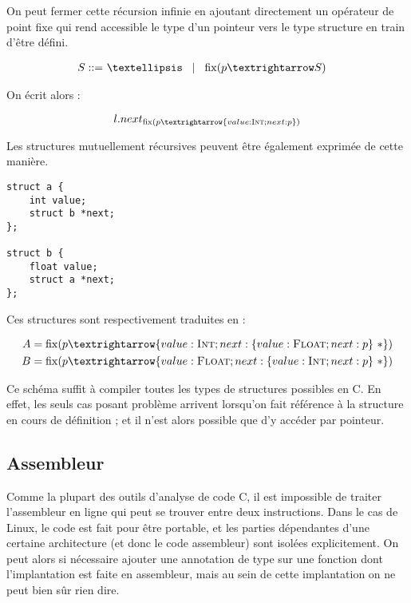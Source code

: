 On peut fermer cette récursion infinie en ajoutant directement un opérateur de
point fixe qui rend accessible le type d'un pointeur vers le type structure en
train d'être défini.

\begin{align*}
    S \gramisa & … \gramorx \mathrm{fix}(p → S)
\end{align*}

On écrit alors :

\[
  l.next_{ \mathrm{fix}(p → \{ value : \tInt ; next : p \}) }
\]

Les structures mutuellement récursives peuvent être également exprimée de cette
manière.

\begin{verbatim}
struct a {
    int value;
    struct b *next;
};

struct b {
    float value;
    struct a *next;
};
\end{verbatim}

Ces structures sont respectivement traduites en :

\begin{align*}
  A &= \mathrm{fix} (p → \{ value : \tInt   ; next : \{ value : \tFloat ; next : p \}~* \}) \\
  B &= \mathrm{fix} (p → \{ value : \tFloat ; next : \{ value : \tInt   ; next : p \}~* \})
\end{align*}

Ce schéma suffit à compiler toutes les types de structures possibles en C. En
effet, les seuls cas posant problème arrivent lorsqu'on fait référence à la
structure en cours de définition ; et il n'est alors possible que d'y accéder
par pointeur.


\subsection{Assembleur}

Comme la plupart des outils d'analyse de code C, il est impossible de traiter
l'assembleur en ligne qui peut se trouver entre deux instructions. Dans le cas
de Linux, le code est fait pour être portable, et les parties dépendantes d'une
certaine architecture (et donc le code assembleur) sont isolées explicitement.
On peut alors si nécessaire ajouter une annotation de type sur une fonction dont
l'implantation est faite en assembleur, mais au sein de cette implantation on ne
peut bien sûr rien dire.

